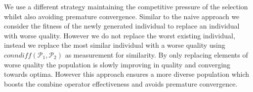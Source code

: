 \documentclass[a4paper,12pt,titlepage, BCOR7mm,headsepline]{scrbook}
\numberwithin{equation}{section}
\begin{document}
We use a different strategy maintaining the competitive pressure of the selection whilst also avoiding premature convergence. Similar to the naive approach we consider the fitness of the newly generated individual to replace an individual with worse quality. However we do not replace the worst existing individual, instead we replace the most similar individual with a worse quality using $conndiff(\mathcal{P}_1,\mathcal{P}_2)$ as measurement for similarity. By only replacing elements of worse quality the population is slowly improving in quality and converging towards optima. However this approach ensures a more diverse population 
which boosts the combine operator effectiveness and avoids premature convergence.%

% 
\end{document}
